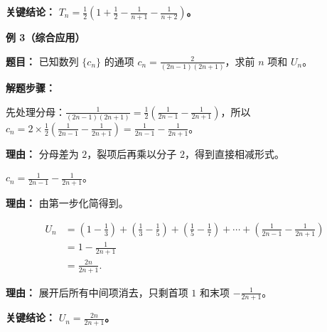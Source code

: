 \begin{examplebox}
	\textbf{\textcolor{CExample}{关键结论：}}
	\textbf{$T_n = \frac{1}{2}\left(1 + \frac{1}{2} - \frac{1}{n+1} - \frac{1}{n+2}\right)$。}

	\medskip
	\textbf{\textcolor{CExample}{例 3（综合应用）}}

	\textbf{\textcolor{CExample}{题目：}}
	已知数列 $\{c_n\}$ 的通项 $c_n = \frac{2}{(2n-1)(2n+1)}$，求前 $n$ 项和 $U_n$。

	\textbf{\textcolor{CExample}{解题步骤：}}
	\begin{description}[style=nextline, leftmargin=2.8em, labelsep=0.5em, itemsep=0.45em]
		\item[\textbf{第一步（转化结构）：}] 先处理分母：$\frac{1}{(2n-1)(2n+1)} = \frac{1}{2}\left(\frac{1}{2n-1} - \frac{1}{2n+1}\right)$，所以 $c_n = 2 \times \frac{1}{2}\left(\frac{1}{2n-1} - \frac{1}{2n+1}\right) = \frac{1}{2n-1} - \frac{1}{2n+1}$。
			\par\textbf{理由：} 分母差为 $2$，裂项后再乘以分子 $2$，得到直接相减形式。
		\item[\textbf{第二步（裂项展开）：}] $c_n = \frac{1}{2n-1} - \frac{1}{2n+1}$。
			\par\textbf{理由：} 由第一步化简得到。
		\item[\textbf{第三步（列项求和）：}]
			\[
				\begin{aligned}
					U_n &= \left(1 - \frac{1}{3}\right) + \left(\frac{1}{3} - \frac{1}{5}\right) + \left(\frac{1}{5} - \frac{1}{7}\right) + \cdots + \left(\frac{1}{2n-1} - \frac{1}{2n+1}\right) \\
					&= 1 - \frac{1}{2n+1} \\
					&= \frac{2n}{2n+1}.
			\end{aligned}
			\]
			\par\textbf{理由：} 展开后所有中间项消去，只剩首项 $1$ 和末项 $-\frac{1}{2n+1}$。
	\end{description}

	\textbf{\textcolor{CExample}{关键结论：}}
	\textbf{$U_n = \frac{2n}{2n+1}$。}
\end{examplebox}
